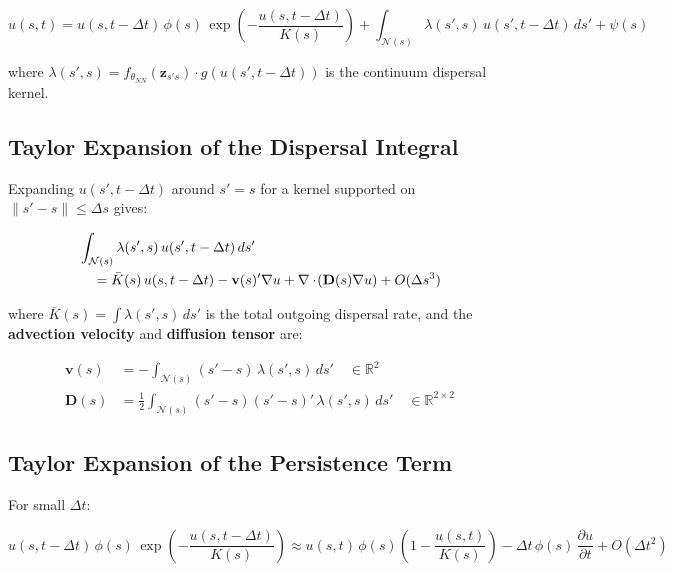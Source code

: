 \documentclass[12pt,a4paper]{article}
\theoremstyle{definition}
\newcommand{\bz}{\bm{z}}
\newcommand{\nn}{f_{\theta_{NN}}}
\begin{document}
\begin{equation}
  u(s, t) =
  u(s, t{-}\Delta t)\, \phi(s)\, \exp\!\!\left(-\frac{u(s,t{-}\Delta t)}{K(s)}\right)
  + \int_{\mathcal{N}(s)} \lambda(s',s)\, u(s', t{-}\Delta t)\, ds'
  + \psi(s)
  \label{eq:meanfield}
\end{equation}

where $\lambda(s',s) = \nn(\bz_{s's}) \cdot g(u(s',t-\Delta t))$ is the
continuum dispersal kernel.

\subsection{Taylor Expansion of the Dispersal Integral}

Expanding $u(s', t-\Delta t)$ around $s' = s$ for a kernel supported on
$\|s'-s\| \leq \Delta s$ gives:

\begin{align}
  &\int_{\mathcal{N}(s)} \lambda(s',s)\, u(s', t-\Delta t)\, ds' \notag\\
  &\quad= \bar{K}(s)\, u(s, t-\Delta t)
    - \mathbf{v}(s)'\nabla u
    + \nabla \cdot\!\left(\mathbf{D}(s)\nabla u\right)
    + O(\Delta s^3)
  \label{eq:taylor-dispersal}
\end{align}

where $\bar{K}(s) = \int \lambda(s',s)\,ds'$ is the total outgoing dispersal
rate, and the \textbf{advection velocity} and \textbf{diffusion tensor} are:

\begin{align}
  \mathbf{v}(s) &=
    -\int_{\mathcal{N}(s)} (s'-s)\, \lambda(s', s)\, ds'
    \quad \in \mathbb{R}^2
  \label{eq:velocity} \\[4pt]
  \mathbf{D}(s) &=
    \frac{1}{2}\int_{\mathcal{N}(s)} (s'-s)(s'-s)'\, \lambda(s', s)\, ds'
    \quad \in \mathbb{R}^{2\times 2}
  \label{eq:diffusion-tensor}
\end{align}

\subsection{Taylor Expansion of the Persistence Term}

For small $\Delta t$:

\begin{equation}
  u(s, t{-}\Delta t)\, \phi(s)\,
  \exp\!\!\left(-\frac{u(s, t{-}\Delta t)}{K(s)}\right)
  \approx
  u(s,t)\, \phi(s)\!\left(1 - \frac{u(s,t)}{K(s)}\right)
  - \Delta t\, \phi(s)\, \frac{\partial u}{\partial t} + O(\Delta t^2)
  \label{eq:taylor-persistence}
\end{equation}
\end{document}
